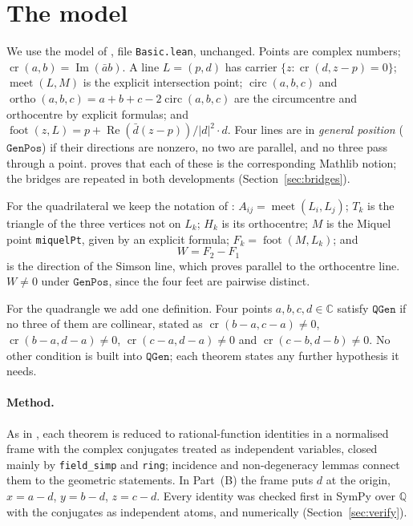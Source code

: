 \documentclass[11pt]{article}
\theoremstyle{definition}
\theoremstyle{remark}
\newcommand{\lean}[1]{\texttt{#1}}
\newcommand{\CC}{\mathbb{C}}
\begin{document}
\section{The model}\label{sec:model}

We use the model of \cite{paperE}, file \lean{Basic.lean}, unchanged. Points are complex numbers;
$\operatorname{cr}(a,b)=\operatorname{Im}(\bar a b)$. A line $L=(p,d)$ has carrier
$\{z:\operatorname{cr}(d,z-p)=0\}$; $\operatorname{meet}(L,M)$ is the explicit intersection point;
$\operatorname{circ}(a,b,c)$ and $\operatorname{ortho}(a,b,c)=a+b+c-2\operatorname{circ}(a,b,c)$ are the
circumcentre and orthocentre by explicit formulas; and
$\operatorname{foot}(z,L)=p+\operatorname{Re}(\bar d(z-p))/|d|^2\cdot d$. Four lines are in
\emph{general position} ($\lean{GenPos}$) if their directions are nonzero, no two are parallel, and no
three pass through a point. \cite{paperE} proves that each of these is the corresponding Mathlib
notion; the bridges are repeated in both developments (Section~\ref{sec:bridges}).

For the quadrilateral we keep the notation of \cite{paperE}: $A_{ij}=\operatorname{meet}(L_i,L_j)$;
$T_k$ is the triangle of the three vertices not on $L_k$; $H_k$ is its orthocentre; $M$ is the Miquel
point \lean{miquelPt}, given by an explicit formula; $F_k=\operatorname{foot}(M,L_k)$; and
\[
  W=F_2-F_1
\]
is the direction of the Simson line, which \cite{paperE} proves parallel to the orthocentre line.
$W\neq0$ under $\lean{GenPos}$, since the four feet are pairwise distinct.

For the quadrangle we add one definition. Four points $a,b,c,d\in\CC$ satisfy $\lean{QGen}$ if no three
of them are collinear, stated as $\operatorname{cr}(b-a,c-a)\neq0$, $\operatorname{cr}(b-a,d-a)\neq0$,
$\operatorname{cr}(c-a,d-a)\neq0$ and $\operatorname{cr}(c-b,d-b)\neq0$. No other condition is built
into $\lean{QGen}$; each theorem states any further hypothesis it needs.

\paragraph{Method.} As in \cite{paperE}, each theorem is reduced to rational-function identities in a
normalised frame with the complex conjugates treated as independent variables, closed mainly by
\lean{field\_simp} and \lean{ring}; incidence and non-degeneracy lemmas connect them to the geometric
statements. In Part~(B) the frame puts $d$ at the origin, $x=a-d$, $y=b-d$, $z=c-d$. Every
identity was checked first in SymPy over $\mathbb{Q}$ with the conjugates as independent atoms, and
numerically (Section~\ref{sec:verify}).
\end{document}
